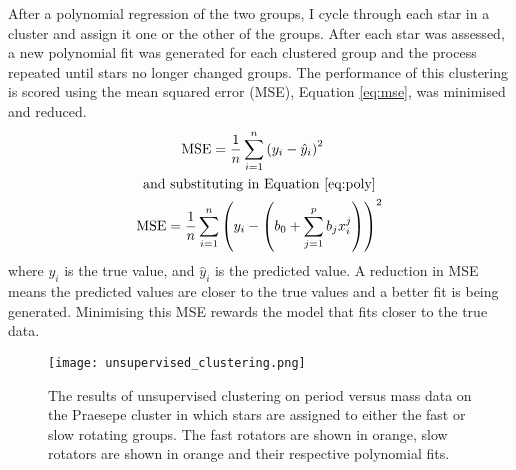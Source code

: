 \documentclass[fleqn,usenatbib]{mnras}
\begin{document}
After a polynomial regression of the two groups, I cycle through each star in a cluster and assign it one or the other of the groups.
After each star was assessed, a new polynomial fit was generated for each clustered group and the process repeated until stars no longer changed groups.
The performance of this clustering is scored using the mean squared error (MSE), Equation \ref{eq:mse}, was minimised and reduced.
\begin{gather}
	\begin{aligned}
		\label{eq:mse}
		\textup{MSE} &= \frac{1}{n}\sum_{i=1}^n \left(y_i - \hat{y}_i\right)^2
	\end{aligned}
	\\
	\begin{aligned}
		\textup{and substituting in Equation \ref{eq:poly}}\nonumber
	\end{aligned}
	\\
	\begin{aligned}
		\textup{MSE} = \frac{1}{n}\sum_{i = 1}^n \left(y_i - \left(b_0 + \sum_{j = 1}^p b_jx_i^j\right) \right)^2
	\end{aligned}
\end{gather}
where $y_i$ is the true value, and $\hat{y}_i$ is the predicted value.
A reduction in MSE means the predicted values are closer to the true values and a better fit is being generated.
Minimising this MSE rewards the model that fits closer to the true data.

\begin{figure}
	\texttt{[image: unsupervised\_clustering.png]}
	\caption{The results of unsupervised clustering on period versus mass data on the Praesepe cluster in which stars are assigned to either the fast or slow rotating groups. The fast rotators are shown in orange, slow rotators are shown in orange and their respective polynomial fits.}
	\label{fig:unsupervised_clustering}
\end{figure}
\end{document}
